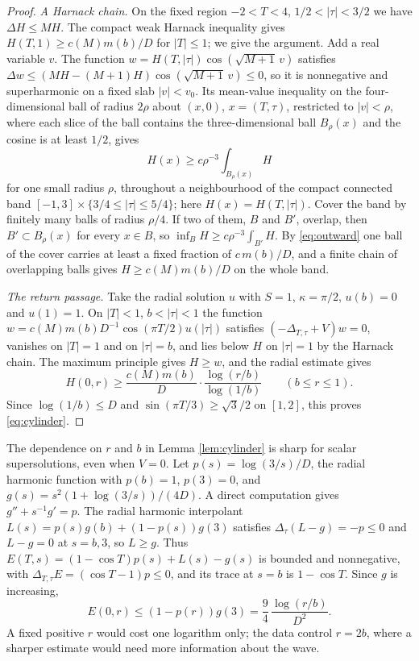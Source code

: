 \begin{proof}
\emph{A Harnack chain.} On the fixed region $-2<T<4$, $1/2<|\tau|<3/2$ we have $\Delta H\le MH$. The
compact weak Harnack inequality gives $H(T,1)\ge c(M)m(b)/D$ for $|T|\le1$; we give the argument.
Add a real variable $v$. The function $w=H(T,|\tau|)\cos(\sqrt{M+1}\,v)$ satisfies
$\Delta w\le(MH-(M+1)H)\cos(\sqrt{M+1}\,v)\le0$, so it is nonnegative and superharmonic on a fixed slab
$|v|<v_0$. Its mean-value inequality on the four-dimensional ball of radius $2\rho$ about
$(x,0)$, $x=(T,\tau)$, restricted to $|v|<\rho$, where each slice of the ball contains the
three-dimensional ball $B_\rho(x)$ and the cosine is at least $1/2$, gives
\[
H(x)\ge c\rho^{-3}\int_{B_\rho(x)}H
\]
for one small radius $\rho$, throughout a neighbourhood of the compact connected band
$[-1,3]\times\{3/4\le|\tau|\le5/4\}$; here $H(x)=H(T,|\tau|)$. Cover the band by finitely many
balls of radius $\rho/4$. If two of them, $B$ and $B'$, overlap, then $B'\subset B_\rho(x)$ for every
$x\in B$, so $\inf_BH\ge c\rho^{-3}\int_{B'}H$. By \eqref{eq:outward} one ball of the cover carries
at least a fixed fraction of $c\,m(b)/D$, and a finite chain of overlapping balls gives
$H\ge c(M)m(b)/D$ on the whole band.

\emph{The return passage.} Take the radial solution $u$ with $S=1$, $\kappa=\pi/2$, $u(b)=0$ and
$u(1)=1$. On $|T|<1$, $b<|\tau|<1$ the function $w=c(M)m(b)D^{-1}\cos(\pi T/2)u(|\tau|)$ satisfies
$(-\Delta_{T,\tau}+V)w=0$, vanishes on $|T|=1$ and on $|\tau|=b$, and lies below $H$ on $|\tau|=1$ by the
Harnack chain. The maximum principle gives $H\ge w$, and the radial estimate gives
\[
H(0,r)\ge\frac{c(M)m(b)}D\cdot\frac{\log(r/b)}{\log(1/b)}\qquad(b\le r\le1).
\]
Since $\log(1/b)\le D$ and $\sin(\pi T/3)\ge\sqrt3/2$ on $[1,2]$, this proves \eqref{eq:cylinder}.
\end{proof}

\begin{remark}\label{rem:cylinder}
The dependence on $r$ and $b$ in Lemma \ref{lem:cylinder} is sharp for scalar supersolutions,
even when $V=0$. Let $p(s)=\log(3/s)/D$, the radial harmonic function with $p(b)=1$, $p(3)=0$, and
$g(s)=s^2(1+\log(3/s))/(4D)$. A direct computation gives $g''+s^{-1}g'=p$. The radial harmonic
interpolant $L(s)=p(s)g(b)+(1-p(s))g(3)$ satisfies $\Delta_\tau(L-g)=-p\le0$ and $L-g=0$ at $s=b,3$, so
$L\ge g$. Thus $E(T,s)=(1-\cos T)p(s)+L(s)-g(s)$ is bounded and nonnegative, with
$\Delta_{T,\tau}E=(\cos T-1)p\le0$, and its trace at $s=b$ is $1-\cos T$. Since $g$ is increasing,
\[
E(0,r)\le(1-p(r))g(3)=\frac94\,\frac{\log(r/b)}{D^2}.
\]
A fixed positive $r$ would cost one logarithm only; the data control $r=2b$, where a sharper
estimate would need more information about the wave.
\end{remark}

